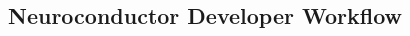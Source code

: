 \documentclass[final]{beamer}\usepackage[]{graphicx}\usepackage[]{color}
\begin{document}
\begin{frame}[fragile]
\begin{table}[!htb]
\begin{minipage}{0.40\linewidth}

\vspace*{-0.5cm}

\vfill

\end{minipage}
\begin{minipage}{0.03\linewidth}
\end{minipage}
\hfill{\vrule width 5pt}\hfill
\begin{minipage}{0.36\linewidth}



\vspace*{-0.65cm}
\section{Neuroconductor Developer Workflow}


\end{minipage}
\end{table}
\end{frame}
\end{document}

